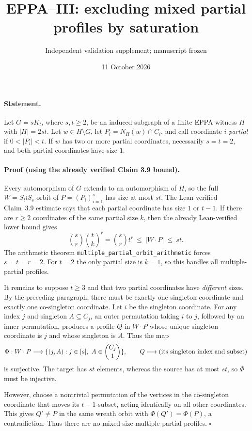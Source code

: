 \documentclass[11pt,a4paper]{article}
\title{EPPA--III: excluding mixed partial profiles by saturation}
\author{Independent validation supplement; manuscript frozen}
\date{11 October 2026}
\begin{document}
\maketitle

\paragraph{Statement.}
Let \(G=sK_t\), where \(s,t\ge2\), be an induced subgraph
of a finite EPPA witness \(H\) with \(|H|=2st\).
Let \(w\in H\setminus G\), let \(P_i=N_H(w)\cap C_i\),
and call coordinate \(i\) \emph{partial} if
\(0<|P_i|<t\). If \(w\) has two or more partial
coordinates, necessarily \(s=t=2\), and both partial
coordinates have size \(1\).

\paragraph{Proof (using the already verified Claim 3.9 bound).}
Every automorphism of \(G\) extends to an automorphism of \(H\),
so the full \(W=S_t\wr S_s\) orbit of \(P=(P_i)_{i=1}^s\)
has size at most \(st\).
The Lean-verified Claim~3.9 estimate says that
each partial coordinate has size \(1\) or \(t-1\).
If there are \(r\ge2\) coordinates of the same partial
size \(k\), then the already Lean-verified lower bound gives
\[
 \binom sr\binom tk^r=\binom sr t^r
 \ \le\ |W\cdot P|\ \le\ st.
 \tag{1}
\]
The arithmetic theorem
\texttt{multiple\_partial\_orbit\_arithmetic}
forces \(s=t=r=2\).
For \(t=2\) the only partial size is \(k=1\),
so this handles all multiple-partial profiles.

It remains to suppose \(t\ge3\) and that two
partial coordinates have \emph{different} sizes.
By the preceding paragraph, there must be exactly
one singleton coordinate and exactly one
co-singleton coordinate. Let \(i\) be the singleton
coordinate.
For any index \(j\) and singleton \(A\subseteq C_j\),
an outer permutation taking \(i\) to \(j\), followed
by an inner permutation, produces a profile \(Q\)
in \(W\cdot P\) whose unique singleton coordinate is
\(j\) and whose singleton is \(A\).
Thus the map
\[
 \Phi:W\cdot P\longrightarrow
 \{(j,A):j\in[s],\ A\in\binom{C_j}{1}\},
 \qquad
 Q\longmapsto(\hbox{its singleton index and subset})
\]
is surjective. The target has \(st\) elements,
whereas the source has at most \(st\), so \(\Phi\)
must be injective.

However, choose a nontrivial permutation of the
vertices in the co-singleton coordinate that
moves its \(t-1\)-subset, acting identically on all
other coordinates. This gives \(Q'\ne P\) in the
same wreath orbit with \(\Phi(Q')=\Phi(P)\),
a contradiction. Thus there are no mixed-size
multiple-partial profiles. \(\square\)
\end{document}
